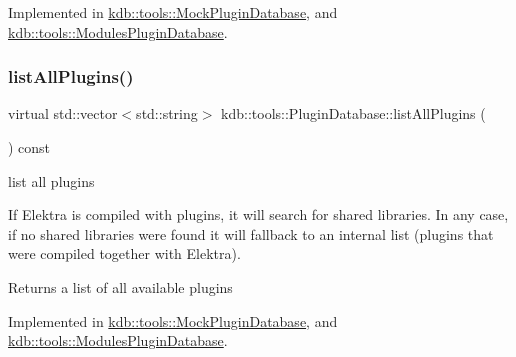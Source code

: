 Implemented in \hyperlink{classkdb_1_1tools_1_1MockPluginDatabase_a5a701fd310be0e9f7d14a865c0226517}{kdb\+::tools\+::\+Mock\+Plugin\+Database}, and \hyperlink{classkdb_1_1tools_1_1ModulesPluginDatabase_a0e81e1b7b296a52f8040fd966b461c3a}{kdb\+::tools\+::\+Modules\+Plugin\+Database}.

\mbox{\label{classkdb_1_1tools_1_1PluginDatabase_adc1f43ccefdd7fc15a57db7571420642}} 
\subsubsection{\texorpdfstring{list\+All\+Plugins()}{listAllPlugins()}}
{\footnotesize\ttfamily virtual std\+::vector$<$std\+::string$>$ kdb\+::tools\+::\+Plugin\+Database\+::list\+All\+Plugins (\begin{DoxyParamCaption}{ }\end{DoxyParamCaption}) const\hspace{0.3cm}{\ttfamily [pure virtual]}}



list all plugins 

If Elektra is compiled with plugins, it will search for shared libraries. In any case, if no shared libraries were found it will fallback to an internal list (plugins that were compiled together with Elektra).

\begin{DoxyReturn}{Returns}
a list of all available plugins 
\end{DoxyReturn}


Implemented in \hyperlink{classkdb_1_1tools_1_1MockPluginDatabase_a3663848683953bfad7123c48c00ab404}{kdb\+::tools\+::\+Mock\+Plugin\+Database}, and \hyperlink{classkdb_1_1tools_1_1ModulesPluginDatabase_a3fa5a08caf47cb79f9889641a96f197b}{kdb\+::tools\+::\+Modules\+Plugin\+Database}.

\mbox{\label{classkdb_1_1tools_1_1PluginDatabase_a3ed261ad8562c423b64cf34cbc086161}} 
